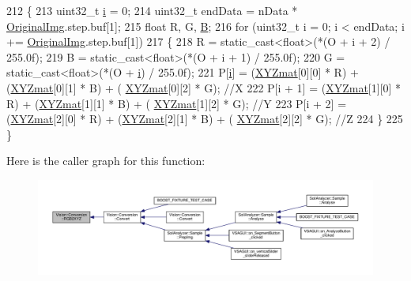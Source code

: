 \begin{DoxyCode}
212     \{
213         uint32\_t \hyperlink{_comparision_pictures_2_createtest_image_8m_a6f6ccfcf58b31cb6412107d9d5281426}{i} = 0;
214         uint32\_t endData = nData * \hyperlink{class_vision_1_1_image_processing_a77c370dab270158a4e9c634e2d3f48e7}{OriginalImg}.step.buf[1];
215         \textcolor{keywordtype}{float} R, G, \hyperlink{struct_b}{B};
216         \textcolor{keywordflow}{for} (uint32\_t i = 0; i < endData; i += \hyperlink{class_vision_1_1_image_processing_a77c370dab270158a4e9c634e2d3f48e7}{OriginalImg}.step.buf[1])
217         \{
218             R = \textcolor{keyword}{static\_cast<}\textcolor{keywordtype}{float}\textcolor{keyword}{>}(*(O + i + 2) / 255.0f);
219             B = \textcolor{keyword}{static\_cast<}\textcolor{keywordtype}{float}\textcolor{keyword}{>}(*(O + i + 1) / 255.0f);
220             G = \textcolor{keyword}{static\_cast<}\textcolor{keywordtype}{float}\textcolor{keyword}{>}(*(O + \hyperlink{_comparision_pictures_2_createtest_image_8m_a6f6ccfcf58b31cb6412107d9d5281426}{i}) / 255.0f);
221             P[\hyperlink{_comparision_pictures_2_createtest_image_8m_a6f6ccfcf58b31cb6412107d9d5281426}{i}] = (\hyperlink{class_vision_1_1_conversion_ad0c6e6c63380927c63da7f967b5e61d1}{XYZmat}[0][0] * R) + (\hyperlink{class_vision_1_1_conversion_ad0c6e6c63380927c63da7f967b5e61d1}{XYZmat}[0][1] * B) + (
      \hyperlink{class_vision_1_1_conversion_ad0c6e6c63380927c63da7f967b5e61d1}{XYZmat}[0][2] * G);    \textcolor{comment}{//X}
222             P[i + 1] = (\hyperlink{class_vision_1_1_conversion_ad0c6e6c63380927c63da7f967b5e61d1}{XYZmat}[1][0] * R) + (\hyperlink{class_vision_1_1_conversion_ad0c6e6c63380927c63da7f967b5e61d1}{XYZmat}[1][1] * B) + (
      \hyperlink{class_vision_1_1_conversion_ad0c6e6c63380927c63da7f967b5e61d1}{XYZmat}[1][2] * G);    \textcolor{comment}{//Y}
223             P[i + 2] = (\hyperlink{class_vision_1_1_conversion_ad0c6e6c63380927c63da7f967b5e61d1}{XYZmat}[2][0] * R) + (\hyperlink{class_vision_1_1_conversion_ad0c6e6c63380927c63da7f967b5e61d1}{XYZmat}[2][1] * B) + (
      \hyperlink{class_vision_1_1_conversion_ad0c6e6c63380927c63da7f967b5e61d1}{XYZmat}[2][2] * G);    \textcolor{comment}{//Z}
224         \}
225     \}
\end{DoxyCode}


Here is the caller graph for this function\+:\nopagebreak
\begin{figure}[H]
\begin{center}
\leavevmode
\includegraphics[width=350pt]{class_vision_1_1_conversion_afe7b24da82f77ff1116f8bc3d0a62fcc_icgraph}
\end{center}
\end{figure}


